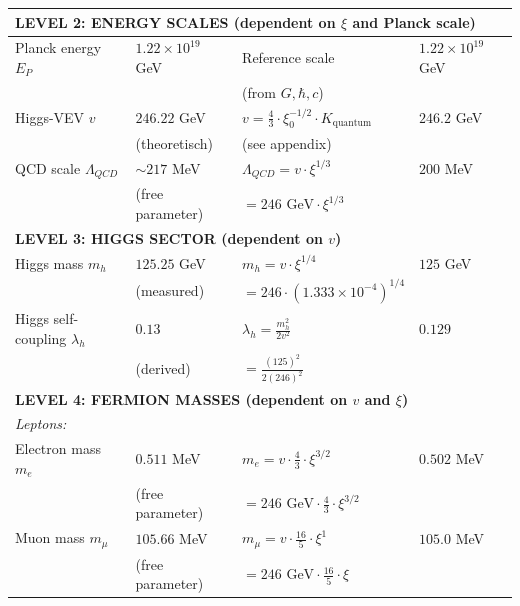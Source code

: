 \documentclass[12pt,a4paper]{report}
\begin{document}
\begin{longtable}{p{4.0cm}p{3.2cm}p{2.8cm}p{2.8cm}}
	\midrule
	\multicolumn{4}{l}{\textbf{LEVEL 2: ENERGY SCALES (dependent on $\xi$ and Planck scale)}} \\
	\midrule
	
	Planck energy $E_P$ & $1.22 \times 10^{19}$ GeV & Reference scale & $1.22 \times 10^{19}$ GeV \\
	& & (from $G, \hbar, c$) & \\[0.3em]
	
Higgs-VEV $v$ & $246.22$ GeV & $v = \frac{4}{3} \cdot \xi_0^{-1/2} \cdot K_{\text{quantum}}$ & $246.2$ GeV \\
& (theoretisch) & (see appendix) & \\[0.3em]
	
	QCD scale $\Lambda_{QCD}$ & $\sim 217$ MeV & $\Lambda_{QCD} = v \cdot \xi^{1/3}$ & $200$ MeV \\
	& (free parameter) & $= 246 \text{ GeV} \cdot \xi^{1/3}$ & \\[0.3em]
	
	\midrule
	\multicolumn{4}{l}{\textbf{LEVEL 3: HIGGS SECTOR (dependent on $v$)}} \\
	\midrule
	
	Higgs mass $m_h$ & $125.25$ GeV & $m_h = v \cdot \xi^{1/4}$ & $125$ GeV \\
	& (measured) & $= 246 \cdot (1.333 \times 10^{-4})^{1/4}$ & \\[0.3em]
	
	Higgs self-coupling $\lambda_h$ & $0.13$ & $\lambda_h = \frac{m_h^2}{2v^2}$ & $0.129$ \\
	& (derived) & $= \frac{(125)^2}{2(246)^2}$ & \\[0.3em]
	
	\midrule
	\multicolumn{4}{l}{\textbf{LEVEL 4: FERMION MASSES (dependent on $v$ and $\xi$)}} \\
	\midrule
	
	\multicolumn{4}{l}{\textit{Leptons:}} \\
	
	Electron mass $m_e$ & $0.511$ MeV & $m_e = v \cdot \frac{4}{3} \cdot \xi^{3/2}$ & $0.502$ MeV \\
	& (free parameter) & $= 246 \text{ GeV} \cdot \frac{4}{3} \cdot \xi^{3/2}$ & \\[0.3em]
	
	Muon mass $m_\mu$ & $105.66$ MeV & $m_\mu = v \cdot \frac{16}{5} \cdot \xi^1$ & $105.0$ MeV \\
	& (free parameter) & $= 246 \text{ GeV} \cdot \frac{16}{5} \cdot \xi$ & \\[0.3em]
	

\end{longtable}
\end{document}
